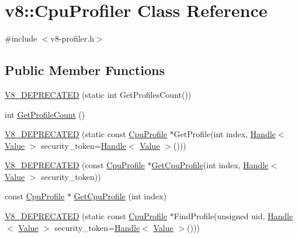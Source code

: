 \hypertarget{classv8_1_1_cpu_profiler}{}\section{v8\+:\+:Cpu\+Profiler Class Reference}
\label{classv8_1_1_cpu_profiler}


{\ttfamily \#include $<$v8-\/profiler.\+h$>$}

\subsection*{Public Member Functions}
\begin{DoxyCompactItemize}
\item 
\hyperlink{classv8_1_1_cpu_profiler_affe0b8d2eda5a298f5d6ca68c022741e}{V8\+\_\+\+D\+E\+P\+R\+E\+C\+A\+T\+E\+D} (static int Get\+Profiles\+Count())
\item 
int \hyperlink{classv8_1_1_cpu_profiler_af49a7c17dfdb194c8bbe2351519575d7}{Get\+Profile\+Count} ()
\item 
\hyperlink{classv8_1_1_cpu_profiler_a42f0678a5b10a7b10924b5347f8dcc88}{V8\+\_\+\+D\+E\+P\+R\+E\+C\+A\+T\+E\+D} (static const \hyperlink{classv8_1_1_cpu_profile}{Cpu\+Profile} $\ast$Get\+Profile(int index, \hyperlink{classv8_1_1_handle}{Handle}$<$ \hyperlink{classv8_1_1_value}{Value} $>$ security\+\_\+token=\hyperlink{classv8_1_1_handle}{Handle}$<$ \hyperlink{classv8_1_1_value}{Value} $>$()))
\item 
\hyperlink{classv8_1_1_cpu_profiler_a2d759506819d40faca9faf05b8997ce7}{V8\+\_\+\+D\+E\+P\+R\+E\+C\+A\+T\+E\+D} (const \hyperlink{classv8_1_1_cpu_profile}{Cpu\+Profile} $\ast$\hyperlink{classv8_1_1_cpu_profiler_a9f5b321b225ec9941290207cdd880ffb}{Get\+Cpu\+Profile}(int index, \hyperlink{classv8_1_1_handle}{Handle}$<$ \hyperlink{classv8_1_1_value}{Value} $>$ security\+\_\+token))
\item 
const \hyperlink{classv8_1_1_cpu_profile}{Cpu\+Profile} $\ast$ \hyperlink{classv8_1_1_cpu_profiler_a9f5b321b225ec9941290207cdd880ffb}{Get\+Cpu\+Profile} (int index)
\item 
\hyperlink{classv8_1_1_cpu_profiler_a16385e0cddd45475d2eecfa967302749}{V8\+\_\+\+D\+E\+P\+R\+E\+C\+A\+T\+E\+D} (static const \hyperlink{classv8_1_1_cpu_profile}{Cpu\+Profile} $\ast$Find\+Profile(unsigned uid, \hyperlink{classv8_1_1_handle}{Handle}$<$ \hyperlink{classv8_1_1_value}{Value} $>$ security\+\_\+token=\hyperlink{classv8_1_1_handle}{Handle}$<$ \hyperlink{classv8_1_1_value}{Value} $>$()))
\item 

\end{DoxyCompactItemize}
